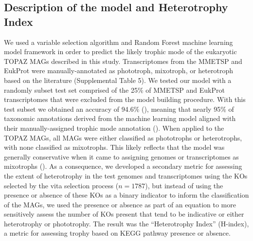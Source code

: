 \documentclass[12pt]{article}
\numberwithin{equation}{section}
\begin{document}
\subsection{Description of the model and Heterotrophy Index}
We used a variable selection algorithm and Random Forest machine learning model framework in order to predict the likely trophic mode of the eukaryotic TOPAZ MAGs described in this study. Transcriptomes from the MMETSP and EukProt were manually-annotated as phototroph, mixotroph, or heterotroph based on the literature (Supplemental Table 5). We tested our model with a randomly subset test set comprised of the 25\% of MMETSP and EukProt transcriptomes \citep{Keeling2014,Richter2020EukProt} that were excluded from the model building procedure. With this test subset we obtained an accuracy of 94.6\% (), meaning that nearly 95\% of taxonomic annotations derived from the machine learning model aligned with their manually-assigned trophic mode annotation ().  When applied to the TOPAZ MAGs, all MAGs were either classified as phototrophs or heterotrophs, with none classified as  mixotrophs. This likely reflects that the model was generally conservative when it came to assigning genomes or transcriptomes as mixotrophs (). As a consequence, we developed a secondary metric for assessing the extent of heterotrophy in the test genomes and transcriptomes using the KOs selected by the vita selection process ($n=1787$), but instead of using the presence or absence of these KOs as a binary indicator to inform the classification of the MAGs, we used the presence or absence as part of an equation to more sensitively assess the number of KOs present that tend to be indicative or either heterotrophy or phototrophy. The result was the ``Heterotrophy Index'' (H-index), a metric for assessing trophy based on KEGG pathway presence or absence. 
\end{document}
